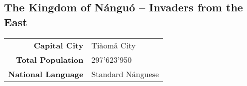 \subsection{The Kingdom of N\'angu\'o -- Invaders from the East}
\begin{tabular}{r | l}
    \textbf{Capital City} & Ti\`aom\v a City\\
    \textbf{Total Population} & 297'623'950\\
    \textbf{National Language} & Standard N\'anguese
\end{tabular}